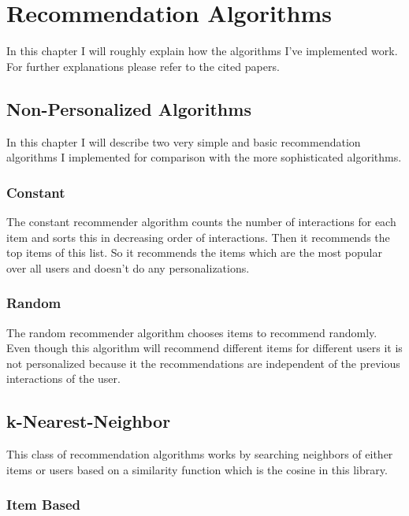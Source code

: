 
\chapter{Recommendation Algorithms}
\label{recommendationalgorithms}
In this chapter I will roughly explain how the algorithms I've implemented
work. For further explanations please refer to the cited papers.


\section{Non-Personalized Algorithms}

In this chapter I will describe two very simple and basic recommendation
algorithms I implemented for comparison with the more sophisticated
algorithms.


\subsection{Constant}

The constant recommender algorithm counts the number of interactions
for each item and sorts this in decreasing order of interactions.
Then it recommends the top items of this list. So it recommends the
items which are the most popular over all users and doesn't do any
personalizations.


\subsection{Random}

The random recommender algorithm chooses items to recommend randomly.
Even though this algorithm will recommend different items for different
users it is not personalized because it the recommendations are
independent of the previous interactions of the user.


\section{k-Nearest-Neighbor}

This class of recommendation algorithms works by searching neighbors
of either items or users based on a similarity function which is the
cosine in this library.


\subsection{Item Based}
\label{itembasedknn}


